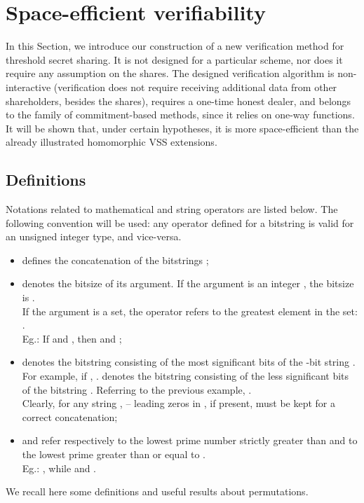 \documentclass[10pt,journal,cspaper,compsoc]{IEEEtran}
\begin{document}
\section{Space-efficient verifiability}
\label{schemes-section}
In this Section, we introduce our construction of a new verification method for threshold secret sharing. It is not designed for a particular scheme, nor does it require any assumption on the shares.
The designed verification algorithm is non-interactive (verification does not require receiving additional data from other shareholders, besides the shares), requires a one-time honest  dealer, and belongs to the family of commitment-based methods, since it relies on one-way functions. It will be shown that, under certain hypotheses, it is more space-efficient than the already illustrated homomorphic VSS extensions.

\subsection{Definitions}
Notations related to mathematical and string operators are listed below. The following convention will be used: any operator defined for a bitstring is valid for an unsigned integer type, and vice-versa.

\begin{itemize}
\item{ defines the concatenation of the bitstrings };
\item{ denotes the bitsize of its argument. If the argument is an integer , the bitsize is
.\\
If the argument is a set, the operator refers to the greatest element in the set:
.\\Eg.: If  and , then  and };
\item  denotes the bitstring consisting of the most significant 
 bits of the -bit string .
For example, if , .  denotes the bitstring consisting of the less significant 
 bits of the bitstring . Referring to the previous example, .\\
Clearly, for any string ,  -- leading zeros in , if present, must be kept for a correct concatenation;
\item  and  refer respectively to the lowest prime number strictly greater than  and to the lowest prime greater than or equal to .\\Eg.: , while  and .
\end{itemize}

We recall here some definitions and useful results about permutations.
\end{document}

